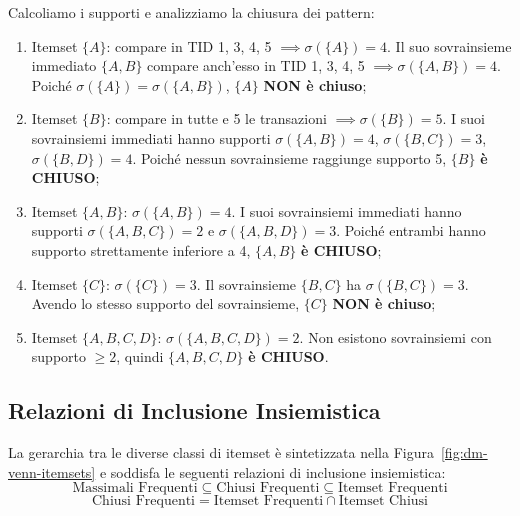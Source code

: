 Calcoliamo i supporti e analizziamo la chiusura dei pattern:
\begin{enumerate}
    \item Itemset $\{A\}$: compare in TID 1, 3, 4, 5 $\implies \sigma(\{A\}) = 4$. Il suo sovrainsieme immediato $\{A, B\}$ compare anch'esso in TID 1, 3, 4, 5 $\implies \sigma(\{A, B\}) = 4$. Poiché $\sigma(\{A\}) = \sigma(\{A, B\})$, $\{A\}$ \textbf{NON è chiuso};
    \item Itemset $\{B\}$: compare in tutte e 5 le transazioni $\implies \sigma(\{B\}) = 5$. I suoi sovrainsiemi immediati hanno supporti $\sigma(\{A, B\}) = 4$, $\sigma(\{B, C\}) = 3$, $\sigma(\{B, D\}) = 4$. Poiché nessun sovrainsieme raggiunge supporto 5, $\{B\}$ \textbf{è CHIUSO};
    \item Itemset $\{A, B\}$: $\sigma(\{A, B\}) = 4$. I suoi sovrainsiemi immediati hanno supporti $\sigma(\{A, B, C\}) = 2$ e $\sigma(\{A, B, D\}) = 3$. Poiché entrambi hanno supporto strettamente inferiore a 4, $\{A, B\}$ \textbf{è CHIUSO};
    \item Itemset $\{C\}$: $\sigma(\{C\}) = 3$. Il sovrainsieme $\{B, C\}$ ha $\sigma(\{B, C\}) = 3$. Avendo lo stesso supporto del sovrainsieme, $\{C\}$ \textbf{NON è chiuso};
    \item Itemset $\{A, B, C, D\}$: $\sigma(\{A, B, C, D\}) = 2$. Non esistono sovrainsiemi con supporto $\ge 2$, quindi $\{A, B, C, D\}$ \textbf{è CHIUSO}.
\end{enumerate}

\FloatBarrier
\subsection{Relazioni di Inclusione Insiemistica}
La gerarchia tra le diverse classi di itemset è sintetizzata nella Figura~\ref{fig:dm-venn-itemsets} e soddisfa le seguenti relazioni di inclusione insiemistica:
\begin{equation}
\label{eq:dm-itemset-hierarchy}
\text{Massimali Frequenti} \subseteq \text{Chiusi Frequenti} \subseteq \text{Itemset Frequenti}
\end{equation}
\begin{equation}
\text{Chiusi Frequenti} = \text{Itemset Frequenti} \cap \text{Itemset Chiusi}
\end{equation}

